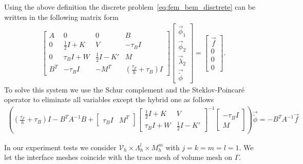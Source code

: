 Using the above definition the discrete problem~\eqref{eq:fem_bem_disctrete} can be written in the following matrix form
\begin{align*}
\begin{bmatrix}
A & 0 & 0 & B \\  
0 & \tfrac12 I + K &  V & - \tau_B I \\
0 & \tau_B I + W & \tfrac12 I - K' & M \\
B^T & - \tau_B I & -M^T & \left(\tfrac{\tau_F}{h} + \tau_B\right) I
\end{bmatrix}
\begin{bmatrix}
\vec{\phi}_1 \\  
\vec{\phi}_2 \\
\vec{\lambda}_2 \\
\vec{\widetilde{\phi}}
\end{bmatrix}
= 
\begin{bmatrix}
\vec{f} \\  
0 \\
0 \\
0
\end{bmatrix}.
\end{align*}
To solve this system we use the Schur complement and the Steklov-Poincar\'e  operator to eliminate all variables except the hybrid one as follows
\begin{align}
\label{eq:Schur}
\left(\left(\tfrac{\tau_F}{h} + \tau_B\right) I  - B^T A^{-1} B + \begin{bmatrix} \tau_B I & M^T \end{bmatrix} \begin{bmatrix}
\tfrac12 I + K &  V  \\
\tau_B I + W & \tfrac12 I - K'
\end{bmatrix}^{-1}
\begin{bmatrix}
 -\tau_B I \\
M
\end{bmatrix} 
\right) \vec{\widetilde{\phi}}
= -B^T A^{-1} \vec{f}
\end{align}


In our experiment tests we consider $\mathcal{V}_h\times \Lambda_{h}^{l} \times M_{h}^{m}$ with $j = k = m = l = 1$. We let the interface meshes  coincide with the trace mesh of volume mesh on $\Gamma$. %

